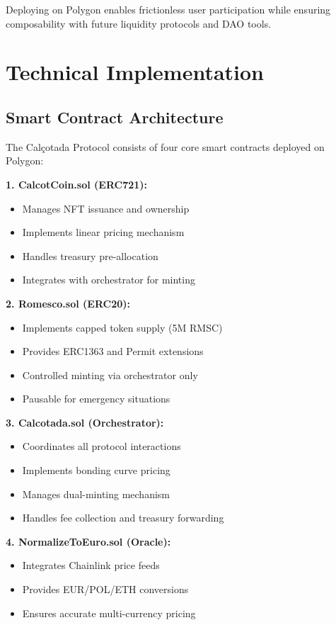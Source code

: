 \documentclass[conference]{IEEEtran}
\begin{document}
Deploying on Polygon enables frictionless user participation while ensuring composability with future liquidity protocols and DAO tools.



\section{Technical Implementation}

\subsection{Smart Contract Architecture}

The Calçotada Protocol consists of four core smart contracts deployed on Polygon:

\textbf{1. CalcotCoin.sol (ERC721):}
\begin{itemize}
    \item Manages NFT issuance and ownership
    \item Implements linear pricing mechanism
    \item Handles treasury pre-allocation
    \item Integrates with orchestrator for minting
\end{itemize}

\textbf{2. Romesco.sol (ERC20):}
\begin{itemize}
    \item Implements capped token supply (5M RMSC)
    \item Provides ERC1363 and Permit extensions
    \item Controlled minting via orchestrator only
    \item Pausable for emergency situations
\end{itemize}

\textbf{3. Calcotada.sol (Orchestrator):}
\begin{itemize}
    \item Coordinates all protocol interactions
    \item Implements bonding curve pricing
    \item Manages dual-minting mechanism
    \item Handles fee collection and treasury forwarding
\end{itemize}

\textbf{4. NormalizeToEuro.sol (Oracle):}
\begin{itemize}
    \item Integrates Chainlink price feeds
    \item Provides EUR/POL/ETH conversions
    \item Ensures accurate multi-currency pricing
\end{itemize}
\end{document}
